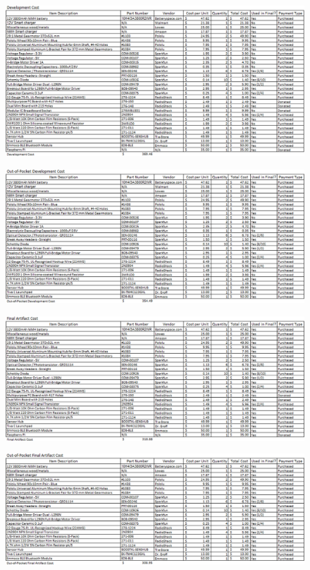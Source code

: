 \documentclass[11pt]{report}
\begin{document}
\begin{spacing}{1.5}
    \begin{figure}[H]
        \includegraphics[width=\textwidth]{Costs1}
    \end{figure}
    \begin{figure}[H]
        \includegraphics[width=\textwidth]{Costs2}
    \end{figure}
    \begin{figure}[H]
        \includegraphics[width=\textwidth]{Costs3}
    \end{figure}
    \begin{figure}[H]
        \includegraphics[width=\textwidth]{Costs4}
    \end{figure}


\end{spacing}
\end{document}
